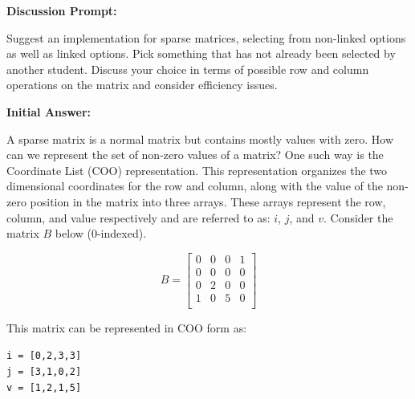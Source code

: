 \documentclass[10pt,letterpaper,final]{report}
\begin{document}
\begin{center}
  \vline
\end{center}


\medskip

\noindent\textbf{Discussion Prompt:}

Suggest an implementation for sparse matrices, selecting from non-linked options as well as linked options. Pick something that has not already been selected by another student. Discuss your choice in terms of possible row and column operations on the matrix and consider efficiency issues.

\medskip
\noindent\textbf{Initial Answer:}
\medskip

A sparse matrix is a normal matrix but contains mostly values with zero. How can we represent the set of non-zero values of a matrix? One such way is the Coordinate List (COO) representation. This representation organizes the two dimensional coordinates for the row and column, along with the value of the non-zero position in the matrix into three arrays. These arrays represent the row, column, and value respectively and are referred to as: $i$, $j$, and $v$. Consider the matrix $B$ below (0-indexed).

\[
B =
  \begin{bmatrix}
    0 & 0 & 0 & 1 \\
    0 & 0 & 0 & 0 \\
    0 & 2 & 0 & 0 \\
    1 & 0 & 5 & 0 \\
  \end{bmatrix}
\]

This matrix can be represented in COO form as:
\begin{center}
  \texttt{i = [0,2,3,3]} \\
  \texttt{j = [3,1,0,2]} \\
  \texttt{v = [1,2,1,5]}
\end{center}
\end{document}
